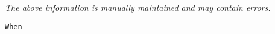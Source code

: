 \label{pkg:when}

{\tiny \it The above information is manually maintained and may contain errors.}
\begin{verbatim}
When
\end{verbatim}
